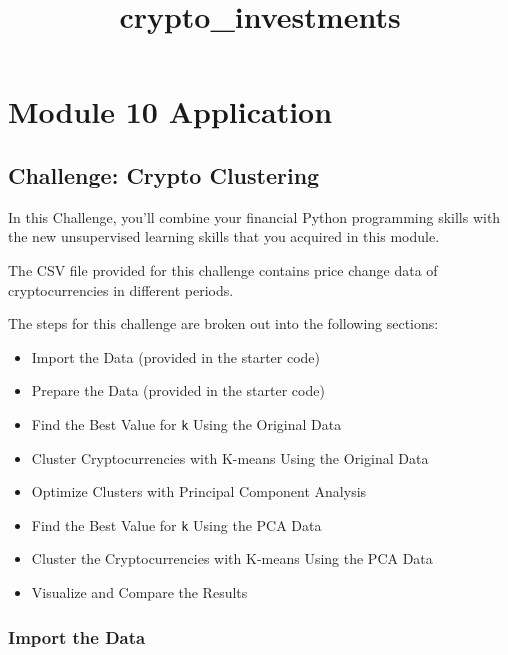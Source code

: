 \documentclass[11pt]{article}
\title{crypto\_investments}
\providecommand{\tightlist}{%
      \setlength{\itemsep}{0pt}\setlength{\parskip}{0pt}}
\begin{document}
    
    \maketitle
    
    

    
    \hypertarget{module-10-application}{%
\section{Module 10 Application}\label{module-10-application}}

\hypertarget{challenge-crypto-clustering}{%
\subsection{Challenge: Crypto
Clustering}\label{challenge-crypto-clustering}}

In this Challenge, you'll combine your financial Python programming
skills with the new unsupervised learning skills that you acquired in
this module.

The CSV file provided for this challenge contains price change data of
cryptocurrencies in different periods.

The steps for this challenge are broken out into the following sections:

\begin{itemize}
\tightlist
\item
  Import the Data (provided in the starter code)
\item
  Prepare the Data (provided in the starter code)
\item
  Find the Best Value for \texttt{k} Using the Original Data
\item
  Cluster Cryptocurrencies with K-means Using the Original Data
\item
  Optimize Clusters with Principal Component Analysis
\item
  Find the Best Value for \texttt{k} Using the PCA Data
\item
  Cluster the Cryptocurrencies with K-means Using the PCA Data
\item
  Visualize and Compare the Results
\end{itemize}

    \hypertarget{import-the-data}{%
\subsubsection{Import the Data}\label{import-the-data}}
\end{document}
